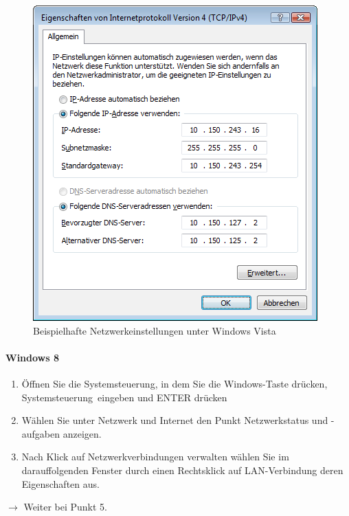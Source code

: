\documentclass[a4paper,12pt]{scrartcl}
\begin{document}
\begin{figure}[h!]
\begin{minipage}[c]{0.48\linewidth}
          \includegraphics[width=\linewidth,keepaspectratio]{Bilder/IP_Windows}
          \caption{Beispielhafte Netzwerkeinstellungen unter Windows Vista}
        \end{minipage}
      \vspace{-20pt}
      \end{figure}
\paragraph*{Windows 8}
\begin{enumerate}
	\item Öffnen Sie die Systemsteuerung, in dem Sie die Windows-Taste drücken, \glqq Systemsteuerung\grqq  \ eingeben und ENTER drücken
	\item Wählen Sie unter Netzwerk und Internet den Punkt Netzwerkstatus und -aufgaben anzeigen.
    \item Nach Klick auf Netzwerkverbindungen verwalten wählen Sie im darauffolgenden Fenster durch einen Rechtsklick auf LAN-Verbindung deren Eigenschaften aus.
\end{enumerate}
$\rightarrow$ Weiter bei Punkt 5.
\end{document}

